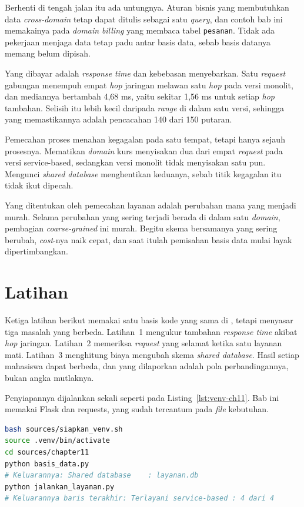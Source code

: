Berhenti di tengah jalan itu ada untungnya. Aturan bisnis yang membutuhkan data
\textit{cross-domain} tetap dapat ditulis sebagai satu \textit{query}, dan contoh bab ini
memakainya pada \textit{domain} \textit{billing} yang membaca tabel \texttt{pesanan}. Tidak ada
pekerjaan menjaga data tetap padu antar basis data, sebab basis datanya memang
belum dipisah.

Yang dibayar adalah \textit{response time} dan kebebasan menyebarkan. Satu \textit{request}
gabungan menempuh empat \textit{hop} jaringan melawan satu \textit{hop} pada versi
monolit, dan mediannya bertambah 4,68 ms, yaitu sekitar 1,56 ms untuk setiap
\textit{hop} tambahan. Selisih itu lebih kecil daripada \textit{range} di dalam
satu versi, sehingga yang memastikannya adalah pencacahan 140 dari 150
putaran.

Pemecahan proses menahan kegagalan pada satu tempat, tetapi hanya sejauh
prosesnya. Mematikan \textit{domain} kurs menyisakan dua dari empat \textit{request} pada
versi service-based, sedangkan versi monolit tidak menyisakan satu pun.
Mengunci \textit{shared database} menghentikan keduanya, sebab titik kegagalan itu
tidak ikut dipecah.

Yang ditentukan oleh pemecahan layanan adalah perubahan mana yang menjadi
murah. Selama perubahan
yang sering terjadi berada di dalam satu \textit{domain}, pembagian \textit{coarse-grained} ini
murah. Begitu skema bersamanya yang sering berubah, \textit{cost}-nya naik cepat, dan
saat itulah pemisahan basis data mulai layak dipertimbangkan.

\section{Latihan}

Ketiga latihan berikut memakai satu basis kode yang sama di
, tetapi menyasar tiga masalah yang berbeda.
Latihan~1 mengukur tambahan \textit{response time} akibat \textit{hop} jaringan. Latihan~2
memeriksa \textit{request} yang selamat ketika satu layanan mati. Latihan~3
menghitung biaya mengubah skema \textit{shared database}. Hasil setiap mahasiswa
dapat berbeda, dan yang dilaporkan adalah pola perbandingannya, bukan angka
mutlaknya.

Penyiapannya dijalankan sekali seperti pada Listing~\ref{lst:venv-ch11}. Bab
ini memakai Flask dan requests, yang sudah tercantum pada \textit{file} kebutuhan.

\begin{lstlisting}[language=bash, caption={Menyiapkan kedua versi sebelum
  ketiga latihan, seluruh skrip tersedia di \berkas{sources/chapter11/}},
  label=lst:venv-ch11]
bash sources/siapkan_venv.sh
source .venv/bin/activate
cd sources/chapter11
python basis_data.py
# Keluarannya: Shared database    : layanan.db
python jalankan_layanan.py
# Keluarannya baris terakhir: Terlayani service-based : 4 dari 4
\end{lstlisting}

